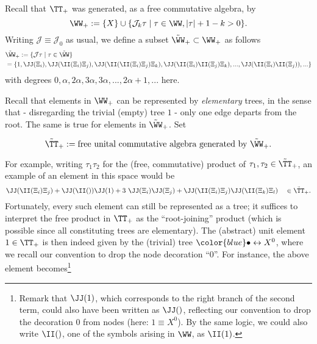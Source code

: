 \documentclass{article}
\begin{document}
Recall that $\TT_+$ was generated, as a free commutative algebra, by 
\[
\WW_+ := \{X\} \cup \{\mathcal{J}_k\tau \mid \tau \in \WW, |\tau|+1-k > 0 \}.
\]
Writing $\mathcal{J} \equiv \mathcal{J}_0$ as usual, we define a subset $\tilde \WW_+ \subset \WW_+$ as follows
\begin{align}
& \tilde \WW_+  := \{ \mathcal{J} \tau \mid \tau \in \tilde \WW  \} \\ \nonumber
& = \{ 1, \JJ(\Xi_i),  \JJ( \II(\Xi_i) \Xi_j ), \JJ (  \II(  \II(\Xi_i) \Xi_j ) \Xi_k ),  \JJ (\II(\Xi_i)\II(\Xi_j) \Xi_k), ... ,\JJ (\II(\Xi_i)\II(\Xi_j)), ... \} 
\end{align}
%
%
%
with degrees $0, \alpha, 2 \alpha, 3 \alpha, 3 \alpha, ..., 2 \alpha + 1,...  $ here. 



Recall that elements in $\WW_+$ can be represented by {\it elementary} trees, in the sense that - disregarding the trivial (empty) tree $1$ - only one edge departs from the root. The same is true for elements in $\tilde \WW_+$. Set

$$\tilde \TT_+ := \text{free unital commutative algebra generated by }    \tilde \WW_+.$$


For example, writing $\tau_1 \tau_2$ for the (free, commutative) product of $\tau_1, \tau_2 \in \tilde \TT_+$, an example of an element in this space would be 
\[
      \JJ ( \II (\Xi_i) \Xi_j ) + 
      \JJ (\II() )  \JJ (1) +
     3 \ \JJ(\Xi_i)  \JJ(\Xi_j)  + \JJ(  \II(\Xi_i) \Xi_j ) \JJ(  \II(\Xi_k) \Xi_l) \quad \in \tilde \TT_+.
\] 
Fortunately, every such element can still be represented as a tree; it suffices to interpret the free product in $\TT_+$ as the ``root-joining'' product
(which is possible since all constituting trees are elementary). The (abstract) unit element $1 \in \TT_+$ is then indeed given by the (trivial) tree ${\color{blue} \bullet} \leftrightarrow X^0$, where we recall our convention to drop the node decoration ``$0$''. For instance, the above element becomes\footnote{Remark that $\JJ (1)$, which corresponds to the right branch of the second term, could also have been written as $\JJ()$, reflecting our convention to drop the decoration $0$ from nodes (here: $1 \equiv X^0$). By the same logic, we could also write $\II()$, one of the symbols arising in $\WW$, as $\II(1)$.}
\end{document}
